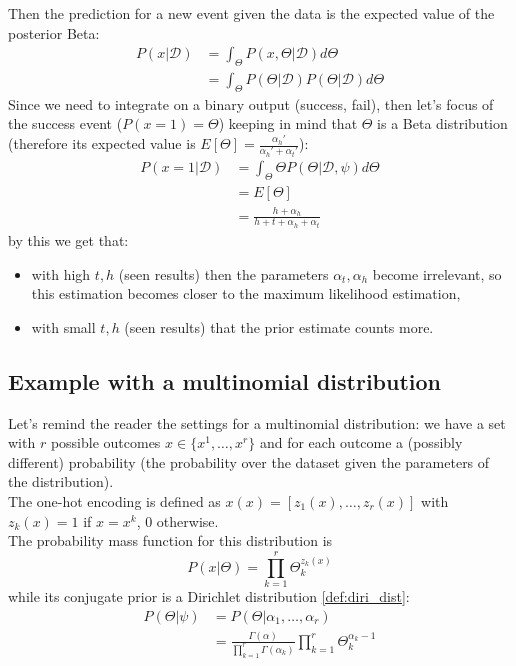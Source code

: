 Then the prediction for a new event given the data is the expected value of the
posterior Beta:
\begin{align*}
	P(x|\mathcal{D}) & = \int_{\Theta}P(x,\Theta|\mathcal{D})d\Theta                     \\
	                 & = \int_{\Theta}P(\Theta|\mathcal{D}) P(\Theta|\mathcal{D})d\Theta
\end{align*}
Since we need to integrate on a binary output (success, fail), then let's focus of
the success event ($P(x=1) =\Theta$) keeping in mind that $\Theta$ is a Beta distribution
(therefore its expected value is
$E[\Theta] = \frac{\alpha_{h}'}{\alpha_{h}' + \alpha_{t}'}$):
\begin{align*}
	P(x = 1 | \mathcal{D}) & = \int_{\Theta}\Theta P(\Theta|\mathcal{D}, \psi) d\Theta \\
	                       & = E[\Theta]                                               \\
	                       & = \frac{h + \alpha_{h}}{h + t + \alpha_{h}+ \alpha_{t}}
\end{align*}
by this we get that:
\begin{itemize}
	\item with high $t, h$ (seen results) then the parameters $\alpha_{t}, \alpha_{h}$
		become irrelevant, so this estimation becomes closer to the maximum
		likelihood estimation,

	\item with small $t, h$ (seen results) that the prior estimate counts more.
\end{itemize}

\subsection{Example with a multinomial distribution}
Let's remind the reader the settings for a multinomial distribution: we have a set
with $r$ possible outcomes $x \in \{x^{1}, \dots, x^{r}\}$ and for each outcome a
(possibly different) probability (the probability over the dataset given the
parameters of the distribution).\\ The one-hot encoding is defined as $x(x) = [z_{1}
(x), \dots, z_{r}(x)]$ with $z_{k}(x) = 1$ if $x = x^{k}$, 0 otherwise.\\ The
probability mass function for this distribution is
\[
	P(x|\Theta) = \prod_{k=1}^{r}\Theta_{k}^{z_k(x)}
\]
while its conjugate prior is a Dirichlet distribution \ref{def:diri_dist}:
\begin{align*}
	P(\Theta|\psi) & = P(\Theta|\alpha_{1}, \dots, \alpha_{r})                                                          \\
	               & = \frac{\Gamma(\alpha)}{\prod_{k=1}^{r}\Gamma (\alpha_{k})}\prod_{k=1}^{r}\Theta_{k}^{\alpha_k -1}
\end{align*}

